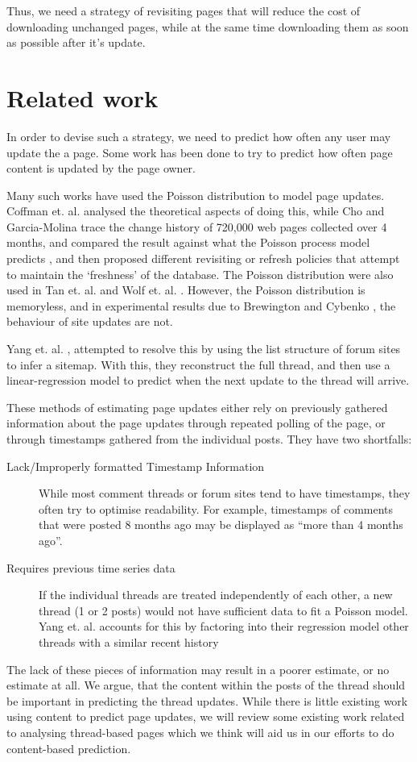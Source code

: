\documentclass{article}
\begin{document}
Thus, we need a strategy of revisiting pages that will reduce the cost of downloading unchanged pages, while at the same time downloading them as soon as possible after it's update.

\section{Related work}
In order to devise such a strategy, we need to predict how often any user may update the a page. Some work has been done to try to predict how often page content is updated by the page owner.

Many such works have used the Poisson distribution to model page updates. Coffman et. al. \cite{Coffman1997} analysed the theoretical aspects of doing this, while Cho and Garcia-Molina trace the change history of 720,000 web pages collected over 4 months, and compared the result against what the Poisson process model predicts \cite{Cho1999}, and then proposed different revisiting or refresh policies \cite{Cho2003,Garcia-molina2003} that attempt to maintain the `freshness' of the database. The Poisson distribution were also used in Tan et. al. \cite{Tan2007} and Wolf et. al. \cite{Wolf2002}. %
However, the Poisson distribution is memoryless, and in experimental results due to Brewington and Cybenko \cite{Brian2000}, the behaviour of site updates are not.

Yang et. al. \cite{Yang2009}, attempted to resolve this by using the list structure of forum sites to infer a sitemap. With this, they reconstruct the full thread, and then use a linear-regression model to predict when the next update to the thread will arrive. %

These methods of estimating page updates either rely on previously gathered information about the page updates through repeated polling of the page, or through timestamps gathered from the individual posts. They have two shortfalls:

\begin{description}
	\item[Lack/Improperly formatted Timestamp Information] While most comment threads or forum sites tend to have timestamps, they often try to optimise readability. For example, timestamps of comments that were posted 8 months ago may be displayed as ``more than 4 months ago''.
	\item[Requires previous time series data]
		If the individual threads are treated independently of each other, a new thread (1 or 2 posts) would not have sufficient data to fit a Poisson model. Yang et. al. \cite{Yang2009} accounts for this by factoring into their regression model other threads with a similar recent history
\end{description}
The lack of these pieces of information may result in a poorer estimate, or no estimate at all. We argue, that the content within the posts of the thread should be important in predicting the thread updates. While there is little existing work using content to predict page updates, we will review some existing work related to analysing thread-based pages which we think will aid us in our efforts to do content-based prediction.
\end{document}
